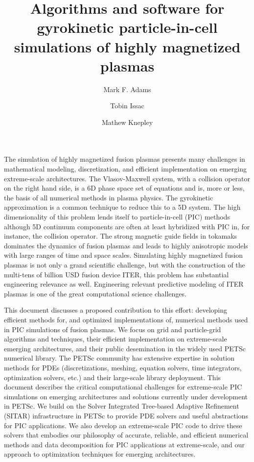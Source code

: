 \documentclass[review]{siamart}
\title{Algorithms and software for gyrokinetic particle-in-cell simulations of highly magnetized plasmas}
\author{Mark F. Adams \and Tobin Issac \and Mathew Knepley}
\begin{document}
\maketitle

The simulation of highly magnetized fusion plasmas presents many challenges in mathematical modeling, discretization, and efficient implementation on emerging extreme-scale architectures.
The Vlasov-Maxwell system, with a collision operator on the right hand side, is a 6D phase space set of equations and is, more or less, the basis of all numerical methods in plasma physics.
The gyrokinetic approximation is a common technique to reduce this to a 5D system.
The high dimensionality of this problem lends itself to particle-in-cell (PIC) methods although 5D continuum components are often at least hybridized with PIC in, for instance, the collision operator.
The strong magnetic guide fields in tokamaks dominates the dynamics of fusion plasmas and leads to highly anisotropic models with large ranges of time and space scales.
Simulating highly magnetized fusion plasmas is not only a grand scientific challenge, but with the construction of the multi-tens of billion USD fusion device ITER, this problem has substantial engineering relevance as well.
Engineering relevant predictive modeling of ITER plasmas is one of the great computational science challenges.

This document discusses a proposed contribution to this effort: developing efficient methods for, and optimized implementations of, numerical methods used in PIC simulations of fusion plasmas. 
We focus on grid and particle-grid algorithms and techniques, their efficient implementation on extreme-scale emerging architectures, and their public desemination in the widely used PETSc  numerical library.
The PETSc community has extensive expertise in solution methods for PDEs (discretizations, meshing, equation solvers, time integrators, optimization solvers, etc.) and their large-scale library deployment.
This document describes the critical computational challenges for extreme-scale PIC simulations on emerging architectures and solutions currently under development in PETSc.
We build on the Solver Integrated Tree-based Adaptive Refinement (SITAR) infrastructure in PETSc to provide PDE solvers and useful abstractions for PIC applications.
We also develop an extreme-scale PIC code to drive these solvers that embodies our philosophy of accurate, reliable, and efficient numerical methods and data decomposition for PIC applications at extreme-scale, and our approach to optimization techniques for emerging architectures.
\end{document}
